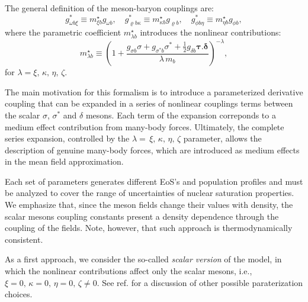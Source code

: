 \documentclass[twocolumn,showpacs,aps]{revtex4}
\begin{document}
The general definition of the meson-baryon couplings are:
\begin{equation}\label{coupling_zen}
g_{\omega b \xi}^{*}\equiv m_{\xi b}^{\star} g_{\omega b},
\quad g_{\varrho b \kappa}^{*}\equiv m_{\kappa b}^{\star} g_{\varrho b},
\quad g_{\phi b \eta}^{*}\equiv m_{\eta b}^{\star} g_{\phi b},\end{equation}
where the parametric coefficient $m_{\lambda b}^{\star}$ introduces the nonlinear contributions:
\begin{equation}\label{mstar_zen}
m_{\lambda b}^{\star}\equiv \left(1+\frac{g_{\sigma b}\sigma+g_{\sigma^* b}\sigma^*
+\frac{1}{2}g_{\delta b}\boldsymbol{\tau.\delta}}{\lambda\,m_{b}}\right)^{-\lambda},
\end{equation}
for $\lambda= \xi,\,\kappa,\,\eta,\,\zeta$.

The main motivation for this formalism is to introduce a parameterized derivative coupling that can be expanded in a series of
nonlinear couplings terms between the scalar $\sigma$, $\sigma^*$ and $\delta$ mesons. 
Each term of the expansion correponds to a medium effect contribution from many-body forces. 
Ultimately, the complete series expansion, controlled by the
$\lambda=\,\xi,\,\kappa,\,\eta,\,\zeta$ parameter, allows the description 
of genuine many-body forces, which are introduced as medium effects in the mean field approximation.

Each set of parameters generates different EoS's and population profiles 
and must be analyzed to cover the range of uncertainties of nuclear saturation properties.
We emphasize that, since the meson fields change their values with density, the scalar mesons 
coupling constants present a density dependence through the coupling of the fields.
Note, however, that such approach is thermodynamically consistent.


As a first approach, we consider the so-called \emph{scalar version} of the model, in which the nonlinear
contributions affect only the scalar mesons, i.e., $\xi=0,\,\kappa=0,\,\eta=0,\,\zeta\neq 0$.
See ref. \cite{Vasconcellos:2014qua} for a discussion of other possible paraterization choices.
\end{document}
